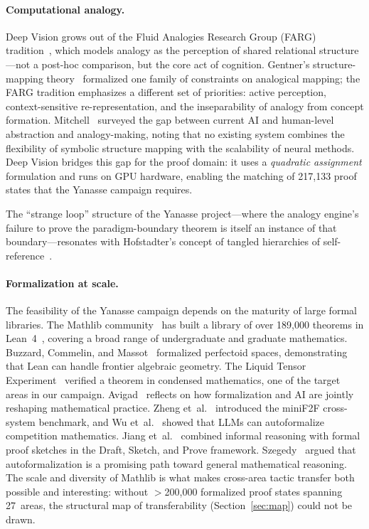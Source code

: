 \documentclass[11pt]{article}
\theoremstyle{definition}
\theoremstyle{remark}
\begin{document}
\paragraph{Computational analogy.}
Deep Vision grows out of the Fluid Analogies Research Group
(FARG) tradition~\cite{hofstadter_fluid_1995, hofstadter_go_1999,
hofstadter_surfaces_2013}, which models analogy as the perception
of shared relational structure---not a post-hoc comparison, but the
core act of cognition.  Gentner's structure-mapping
theory~\cite{gentner1983structure} formalized one family of
constraints on analogical mapping; the FARG tradition emphasizes a
different set of priorities: active perception, context-sensitive
re-representation, and the inseparability of analogy from concept
formation.  Mitchell~\cite{mitchell2021analogy} surveyed the gap
between current AI and human-level abstraction and analogy-making,
noting that no existing system combines the flexibility of symbolic
structure mapping with the scalability of neural methods.
Deep Vision bridges this gap for the proof domain:
it uses a \emph{quadratic assignment} formulation and runs on GPU
hardware, enabling the matching of 217{,}133 proof states that the
Yanasse campaign requires.

The ``strange loop'' structure of the Yanasse project---where the
analogy engine's failure to prove the paradigm-boundary theorem is
itself an instance of that boundary---resonates with Hofstadter's
concept of tangled hierarchies of
self-reference~\cite{hofstadter_go_1999, hofstadter2007loop}.

\paragraph{Formalization at scale.}
The feasibility of the Yanasse campaign depends on the maturity of
large formal libraries.  The Mathlib community~\cite{mathlib2020}
has built a library of over 189{,}000 theorems in
Lean~4~\cite{moura2021lean4}, covering a broad range of
undergraduate and graduate mathematics.  Buzzard, Commelin, and
Massot~\cite{buzzard2020perfectoid} formalized perfectoid spaces,
demonstrating that Lean can handle frontier algebraic geometry.
The Liquid Tensor Experiment~\cite{scholze2022lte} verified
a theorem in condensed mathematics, one of the target areas in
our campaign.  Avigad~\cite{avigad2024formalturn} reflects on how
formalization and AI are jointly reshaping mathematical practice.
Zheng et~al.~\cite{zheng2022minif2f} introduced the miniF2F
cross-system benchmark, and Wu
et~al.~\cite{wu2022autoformalization} showed that LLMs can
autoformalize competition mathematics.  Jiang
et~al.~\cite{jiang2023dsp} combined informal reasoning with formal
proof sketches in the Draft, Sketch, and Prove framework.
Szegedy~\cite{szegedy2020autoformalization} argued that
autoformalization is a promising path toward general mathematical
reasoning.  The scale and diversity of Mathlib is what makes
cross-area tactic transfer both possible and interesting: without
$>$200{,}000 formalized proof states spanning 27~areas, the
structural map of transferability (Section~\ref{sec:map}) could not
be drawn.
\end{document}
